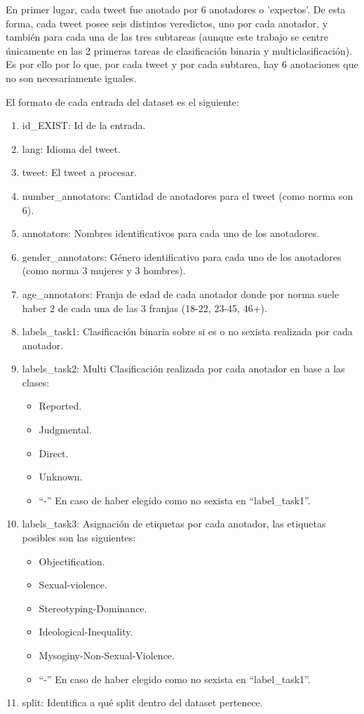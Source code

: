 En primer lugar, cada tweet fue anotado por 6 anotadores o 'expertos'. De esta forma, cada tweet posee seis distintos veredictos, uno por cada anotador, y también para cada una de las tres subtareas (aunque este trabajo se centre únicamente en las 2 primeras tareas de clasificación binaria y multiclasificación). Es por ello por lo que, por cada tweet y por cada subtarea, hay 6 anotaciones que no son necesariamente iguales.


El formato de cada entrada del dataset es el siguiente:

\begin{enumerate}
        \item id\_EXIST: Id de la entrada.
        \item lang: Idioma del tweet.
        \item tweet: El tweet a procesar.
        \item number\_annotators: Cantidad de anotadores para el tweet (como norma son 6).
        \item annotators: Nombres identificativos para cada uno de los anotadores.
        \item gender\_annotators: Género identificativo para cada uno de los anotadores (como norma 3 mujeres y 3 hombres).
        \item age\_annotators: Franja de edad de cada anotador donde por norma suele haber 2 de cada una de las 3 franjas (18-22, 23-45, 46+).
        \item labels\_task1: Clasificación binaria sobre si es o no sexista realizada por cada anotador.
        \item labels\_task2: Multi Clasificación realizada por cada anotador en base a las clases:
            \begin{itemize}
                \item Reported.
                \item Judgmental.
                \item Direct.
                \item Unknown.
                \item “-” En caso de haber elegido como no sexista en “label\_task1”.
            \end{itemize}
        \item labels\_task3: Asignación de etiquetas por cada anotador, las etiquetas posibles son las siguientes: 
            \begin{itemize}
                \item Objectification.
                \item Sexual-violence.
                \item Stereotyping-Dominance.
                \item Ideological-Inequality.
                \item Mysoginy-Non-Sexual-Violence.
                \item “-” En caso de haber elegido como no sexista en “label\_task1”.
            \end{itemize}
        \item split: Identifica a qué split dentro del dataset pertenece.

\end{enumerate}

